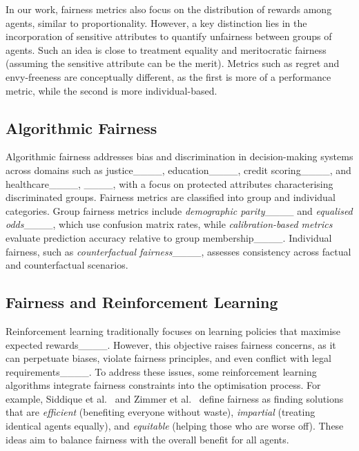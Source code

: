In our work, fairness metrics also focus on the distribution of rewards among agents, similar to proportionality. 
However, a key distinction lies in the incorporation of sensitive attributes to quantify unfairness between groups of agents. Such an idea is close to treatment equality and meritocratic fairness (assuming the sensitive attribute can be the merit). Metrics such as regret and envy-freeness are conceptually different, as the first is more of a performance metric, while the second is more individual-based.

\subsection{Algorithmic Fairness}
Algorithmic fairness addresses bias and discrimination in decision-making systems across domains such as justice____, education____, credit scoring____, and healthcare____, ____, with a focus on protected attributes characterising discriminated groups.
Fairness metrics are classified into group and individual categories. Group fairness metrics include \textit{demographic parity}____ and \textit{equalised odds}____, which use confusion matrix rates, while \textit{calibration-based metrics} evaluate prediction accuracy relative to group membership____. Individual fairness, such as \textit{counterfactual fairness}____, assesses consistency across factual and counterfactual scenarios.

\subsection{Fairness and Reinforcement Learning}
Reinforcement learning traditionally focuses on learning policies that maximise expected rewards____. However, this objective raises fairness concerns, as it can perpetuate biases, violate fairness principles, and even conflict with legal requirements____. To address these issues, some reinforcement learning algorithms integrate fairness constraints into the optimisation process. For example, Siddique et al.~ and Zimmer et al.~ define fairness as finding solutions that are \textit{efficient} (benefiting everyone without waste), \textit{impartial} (treating identical agents equally), and \textit{equitable} (helping those who are worse off). These ideas aim to balance fairness with the overall benefit for all agents.

